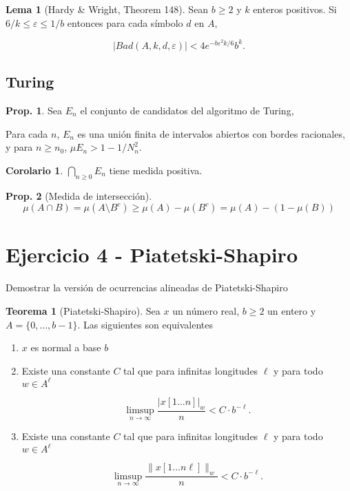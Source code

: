 \documentclass{article}
\theoremstyle{definition} %
\newtheorem{theorem}{Teorema}
\newtheorem{lemma}{Lema}
\newtheorem{proposition}{Prop.}
\newtheorem*{corollary*}{Corolario}
\newcommand{\measure}[1]{\mu\left(#1\right)}
\begin{document}
\begin{lemma}[Hardy \& Wright, Theorem 148]\label{lemma:bad-HW}
    Sean $b \geq 2$ y $k$ enteros positivos. Si $6/k \leq \varepsilon \leq 1/b$
    entonces para cada símbolo $d$ en $A$, 
    
    \[
        |Bad(A, k, d, \varepsilon)| < 4e^{-b\varepsilon^2k/6}b^k.
    \]
\end{lemma}

\subsection{Turing}

\begin{proposition}\label{prop:turing-en-positive-measure}
    Sea $E_n$ el conjunto de candidatos del algoritmo de Turing,

    Para cada $n$, $E_n$ es una unión finita de intervalos abiertos con bordes
    racionales, y para $n \geq n_0$, $\mu E_n > 1 - 1/N_n^2$.

    \begin{corollary*}
        $\bigcap_{n \geq 0} E_n$ tiene medida positiva.
    \end{corollary*}
\end{proposition}

\begin{proposition}[Medida de intersección]\label{prop:lebesgue-cap}
    \[
        \measure{A \cap B} 
        = \measure{A \setminus B^c}
        \geq \measure{A} - \measure{B^c} 
        = \measure{A} - ( 1 - \measure{B})
    \]
\end{proposition}

\section*{Ejercicio 4 - Piatetski-Shapiro}

Demostrar la versión de ocurrencias alineadas de Piatetski-Shapiro

\begin{theorem}[Piatetski-Shapiro]\label{teo:piatetski-shapiro}
    Sea $x$ un número real, $b \geq 2$ un entero y $A = \{0, \dots, b - 1\}$.
    Las siguientes son equivalentes
    \begin{enumerate}
        \item $x$ es normal a base $b$
        \item Existe una constante $C$ tal que para infinitas longitudes $\ell$ y
        para todo $w \in A^\ell$

        \[
            \limsup_{n \to \infty}
            \frac{|x[1\dots n]|_w}{n} < C \cdot b^{-\ell}.
        \]
        \item Existe una constante $C$ tal que para infinitas longitudes $\ell$ y
        para todo $w \in A^\ell$

        \[
            \limsup_{n \to \infty}
            \frac{\|x[1\dots n\ell]\|_w}{n} < C \cdot b^{-\ell}.
        \] 
    \end{enumerate}
\end{theorem}
\end{document}
